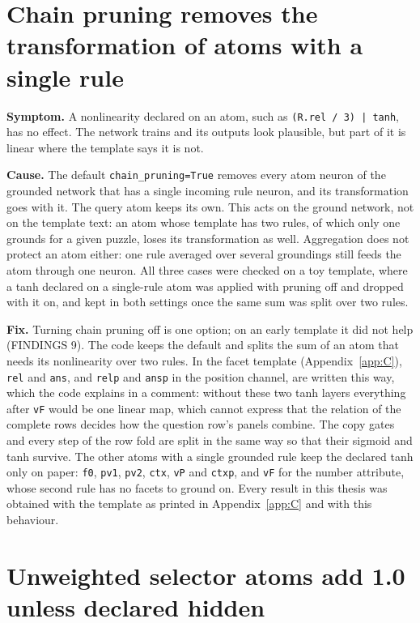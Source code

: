 \section{Chain pruning removes the transformation of atoms with a single rule}\label{sec:A.2}

\textbf{Symptom.} A nonlinearity declared on an atom, such as \texttt{(R.rel / 3) | tanh}, has no effect. The network trains and its outputs look plausible, but part of it is linear where the template says it is not.

\textbf{Cause.} The default \texttt{chain\_pruning=True} removes every atom neuron of the grounded network that has a single incoming rule neuron, and its transformation goes with it. The query atom keeps its own. This acts on the ground network, not on the template text: an atom whose template has two rules, of which only one grounds for a given puzzle, loses its transformation as well. Aggregation does not protect an atom either: one rule averaged over several groundings still feeds the atom through one neuron. All three cases were checked on a toy template, where a tanh declared on a single-rule atom was applied with pruning off and dropped with it on, and kept in both settings once the same sum was split over two rules.

\textbf{Fix.} Turning chain pruning off is one option; on an early template it did not help (FINDINGS 9). The code keeps the default and splits the sum of an atom that needs its nonlinearity over two rules. In the facet template (Appendix~\ref{app:C}), \texttt{rel} and \texttt{ans}, and \texttt{relp} and \texttt{ansp} in the position channel, are written this way, which the code explains in a comment: without these two tanh layers everything after \texttt{vF} would be one linear map, which cannot express that the relation of the complete rows decides how the question row's panels combine. The copy gates and every step of the row fold are split in the same way so that their sigmoid and tanh survive. The other atoms with a single grounded rule keep the declared tanh only on paper: \texttt{f0}, \texttt{pv1}, \texttt{pv2}, \texttt{ctx}, \texttt{vP} and \texttt{ctxp}, and \texttt{vF} for the number attribute, whose second rule has no facets to ground on. Every result in this thesis was obtained with the template as printed in Appendix~\ref{app:C} and with this behaviour.

\section{Unweighted selector atoms add 1.0 unless declared hidden}\label{sec:A.3}

